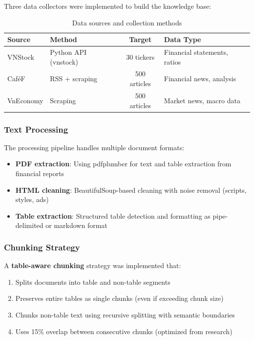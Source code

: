 \documentclass[12pt,a4paper]{article}
\begin{document}
Three data collectors were implemented to build the knowledge base:

\begin{table}[H]
\centering
\caption{Data sources and collection methods}
\label{tab:data_sources}
\begin{tabular}{llcp{5cm}}
\toprule
\textbf{Source} & \textbf{Method} & \textbf{Target} & \textbf{Data Type} \\
\midrule
VNStock & Python API (vnstock) & 30 tickers & Financial statements, ratios \\
CaféF & RSS + scraping & 500 articles & Financial news, analysis \\
VnEconomy & Scraping & 500 articles & Market news, macro data \\
\bottomrule
\end{tabular}
\end{table}

\subsubsection{Text Processing}

The processing pipeline handles multiple document formats:
\begin{itemize}
    \item \textbf{PDF extraction}: Using pdfplumber for text and table
    extraction from financial reports
    \item \textbf{HTML cleaning}: BeautifulSoup-based cleaning with noise
    removal (scripts, styles, ads)
    \item \textbf{Table extraction}: Structured table detection and formatting
    as pipe-delimited or markdown format
\end{itemize}

\subsubsection{Chunking Strategy}

A \textbf{table-aware chunking} strategy was implemented that:
\begin{enumerate}
    \item Splits documents into table and non-table segments
    \item Preserves entire tables as single chunks (even if exceeding chunk
    size)
    \item Chunks non-table text using recursive splitting with semantic
    boundaries
    \item Uses 15\% overlap between consecutive chunks (optimized from research)
\end{enumerate}
\end{document}
